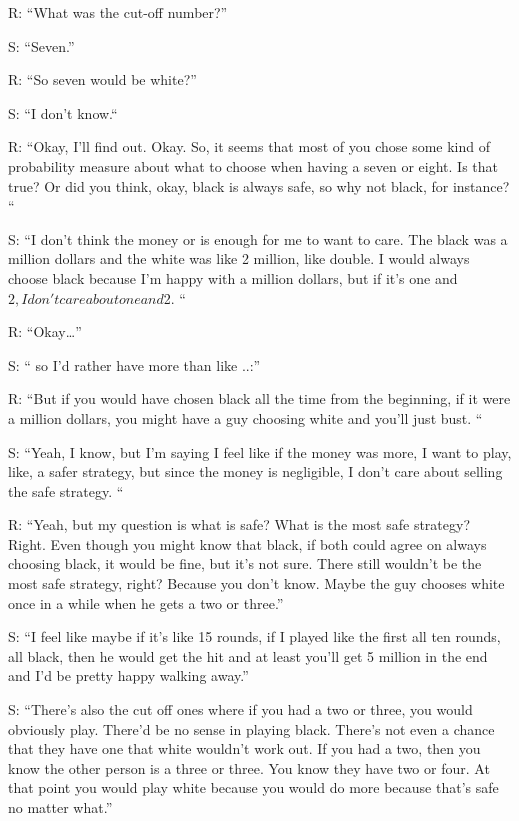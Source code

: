 R: “What was the cut-off number?”

S: “Seven.”

R: “So seven would be white?”

S: “I don't know.“

R: “Okay, I'll find out. Okay. So, it seems that most of you chose some kind of probability measure about what to choose when having a seven or eight. Is that true? Or did you think, okay, black is always safe, so why not black, for instance? “

S: “I don't think the money or is enough for me to want to care. The black was a million dollars and the white was like 2 million, like double. I would always choose black because I'm happy with a million dollars, but if it's one and $2, I don't care about one and $2. “

R: “Okay…”

S: “ so I'd rather have more than like ..:”

R: “But if you would have chosen black all the time from the beginning, if it were a million dollars, you might have a guy choosing white and you'll just bust. “

S: “Yeah, I know, but I'm saying I feel like if the money was more, I want to play, like, a safer strategy, but since the money is negligible, I don't care about selling the safe strategy. “ %

R: “Yeah, but my question is what is safe? What is the most safe strategy? Right. Even though you might know that black, if both could agree on always choosing black, it would be fine, but it's not sure. There still wouldn't be the most safe strategy, right? Because you don't know. Maybe the guy chooses white once in a while when he gets a two or three.”

S: “I feel like maybe if it's like 15 rounds, if I played like the first all ten rounds, all black, then he would get the hit and at least you'll get 5 million in the end and I'd be pretty happy walking away.”

S: “There's also the cut off ones where if you had a two or three, you would obviously play.  There'd be no sense in playing black. There's not even a chance that they have one that white wouldn't work out. If you had a two, then you know the other person is a three or three. You know they have two or four. At that point you would play white because you would do more because that's safe no matter what.”

